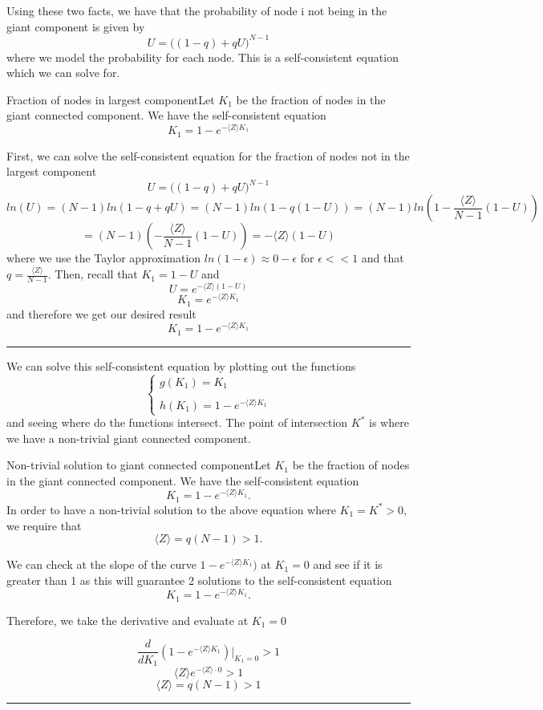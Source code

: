 \documentclass[twoside]{article}
\newenvironment{proof}{{\bf Proof:}}{\hfill\rule{2mm}{2mm}}
\begin{document}
Using these two facts, we have that the probability of node i not being in the giant component is given by 
$$
U = \bigg((1 - q) + qU \bigg)^{N-1}
$$
where we model the probability for each node. This is a self-consistent equation which we can solve for.

\begin{theorem_exam}{Fraction of nodes in largest component}{}Let $K_1$ be the fraction of nodes in the giant connected component. We have the self-consistent equation
$$
K_1 = 1 - e^{-\langle Z \rangle K_1}
$$
\end{theorem_exam}

\begin{proof} First, we can solve the self-consistent equation for the fraction of nodes not in the largest component
$$
U = \bigg((1 - q) + qU \bigg)^{N-1}
$$
$$
ln(U) = (N - 1)ln(1 - q + qU) = (N - 1)ln(1 - q(1 - U)) = (N - 1)ln(1 - \frac{\langle Z \rangle}{N - 1}(1 - U))
$$
$$
= (N - 1) (-\frac{\langle Z \rangle}{N - 1}(1 - U)) = - \langle Z \rangle (1 - U)
$$
where we use the Taylor approximation $ln(1 - \epsilon) \approx 0 - \epsilon$ for $\epsilon << 1$ and that $q = \frac{\langle Z \rangle}{N - 1}.$
Then, recall that $K_1 = 1 - U$ and 
$$
U = e^{- \langle Z \rangle (1 - U)}
$$
$$
K_1 = e^{- \langle Z \rangle K_1}
$$
and therefore we get our desired result 
$$
K_1 = 1 - e^{-\langle Z \rangle K_1}
$$
\end{proof}

We can solve this self-consistent equation by plotting out the functions 
$$
\begin{cases}
g(K_1) = K_1 \\\\
h(K_1) = 1 - e^{-\langle Z \rangle K_1}
\end{cases}
$$
and seeing where do the functions intersect. The point of intersection $K^*$ is where we have a non-trivial giant connected component.

\begin{theorem_exam}{Non-trivial solution to giant connected component}{}Let $K_1$ be the fraction of nodes in the giant connected component. We have the self-consistent equation
$$
K_1 = 1 - e^{-\langle Z \rangle K_1}.
$$ In order to have a non-trivial solution to the above equation where $K_1 = K^* > 0$, we require that
$$
\langle Z \rangle = q(N - 1) > 1.
$$
\end{theorem_exam}

\begin{proof} We can check at the slope of the curve $1 - e^{-\langle Z \rangle K_1})$ at $K_1 = 0$ and see if it is greater than 1 as this will guarantee 2 solutions to the self-consistent equation 
$$
K_1 = 1 - e^{-\langle Z \rangle K_1}.
$$

Therefore, we take the derivative and evaluate at $K_1 = 0$

$$
\frac{d}{dK_1}(1 - e^{-\langle Z \rangle K_1})\bigg|_{K_{1} = 0} > 1
$$
$$
\langle Z \rangle e^{- \langle Z \rangle \cdot 0} > 1
$$
$$
\langle Z \rangle = q (N - 1) > 1
$$
\end{proof}
\end{document}
